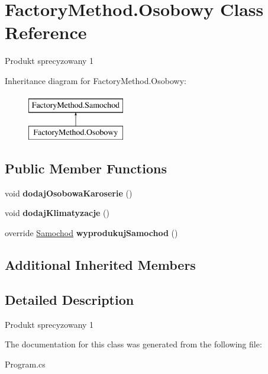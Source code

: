 \hypertarget{class_factory_method_1_1_osobowy}{}\section{Factory\+Method.\+Osobowy Class Reference}
\label{class_factory_method_1_1_osobowy}


Produkt sprecyzowany 1  


Inheritance diagram for Factory\+Method.\+Osobowy\+:\begin{figure}[H]
\begin{center}
\leavevmode
\includegraphics[height=2.000000cm]{class_factory_method_1_1_osobowy}
\end{center}
\end{figure}
\subsection*{Public Member Functions}
\begin{DoxyCompactItemize}
\item 
\mbox{\label{class_factory_method_1_1_osobowy_a58a445d439d534e5ed01ec2369d0e3fc}} 
void {\bfseries dodaj\+Osobowa\+Karoserie} ()
\item 
\mbox{\label{class_factory_method_1_1_osobowy_ac2167fa6a5d1bed16bf0c4b5ab66e798}} 
void {\bfseries dodaj\+Klimatyzacje} ()
\item 
\mbox{\label{class_factory_method_1_1_osobowy_ad47c1ea3189a40fb76dbb006aa9fc770}} 
override \hyperlink{class_factory_method_1_1_samochod}{Samochod} {\bfseries wyprodukuj\+Samochod} ()
\end{DoxyCompactItemize}
\subsection*{Additional Inherited Members}


\subsection{Detailed Description}
Produkt sprecyzowany 1 



The documentation for this class was generated from the following file\+:\begin{DoxyCompactItemize}
\item 
Program.\+cs\end{DoxyCompactItemize}
